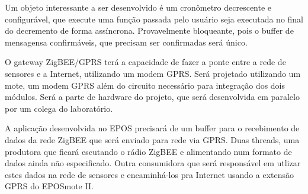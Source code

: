 Um objeto interessante a ser desenvolvido \'e um cron\^ometro decrescente e configur\'avel, que execute uma fun\c{c}\~ao passada pelo usu\'ario seja executada no final do decremento de forma ass\'incrona. Provavelmente bloqueante, pois o buffer de mensagensa confirm\'aveis, que precisam ser confirmadas ser\'a \'unico.

O gateway ZigBEE/GPRS ter\'a a capacidade de fazer a ponte entre a rede de sensores e a Internet, utilizando um modem GPRS. Ser\'a projetado utilizando um mote, um modem GPRS al\'em do circuito necess\'ario para integra\c{c}\~ao dos dois m\'odulos. Ser\'a a parte de hardware do projeto, que ser\'a desenvolvida em paralelo por um colega do laborat\'orio.

A aplica\c{c}\~ao desenvolvida no EPOS precisar\'a de um buffer para o recebimento de dados da rede ZigBEE que ser\'a enviado para rede via GPRS. Duas threads, uma produtora que ficar\'a escutando o r\'adio ZigBEE e alimentando num formato de dados ainda n\~ao especificado. Outra consumidora que ser\'a respons\'avel em utlizar estes dados na rede de sensores e encaminh\'a-los pra Internet usando a extens\~ao GPRS do EPOSmote II.
